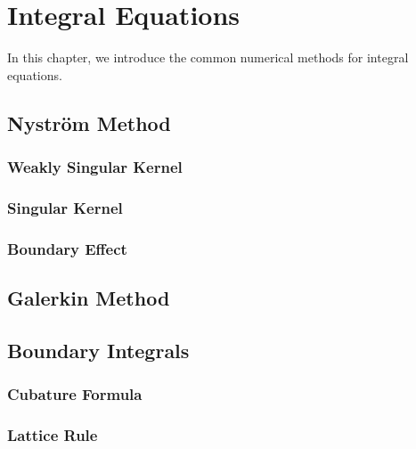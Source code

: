 \chapter{Integral Equations}
In this chapter, we introduce the common numerical methods for integral equations.  
\section{Nystr\"om Method}
\subsection{Weakly Singular Kernel}
\subsection{Singular Kernel}
\subsection{Boundary Effect}

\section{Galerkin Method}

\section{Boundary Integrals}

\subsection{Cubature Formula}
\subsection{Lattice Rule}